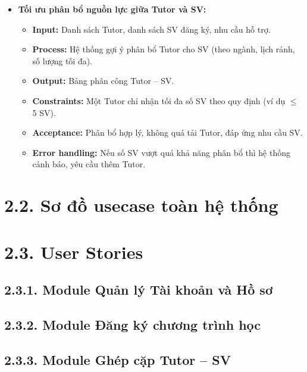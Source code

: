 \begin{itemize}
    \item \textbf{Tối ưu phân bổ nguồn lực giữa Tutor và SV:}
    \begin{itemize}
        \item \textbf{Input:} Danh sách Tutor, danh sách SV đăng ký, nhu cầu hỗ trợ.
        \item \textbf{Process:} Hệ thống gợi ý phân bổ Tutor cho SV (theo ngành, lịch rảnh, số lượng tối đa).
        \item \textbf{Output:} Bảng phân công Tutor – SV.
        \item \textbf{Constraints:} Một Tutor chỉ nhận tối đa số SV theo quy định (ví dụ $\leq$ 5 SV).
        \item \textbf{Acceptance:} Phân bổ hợp lý, không quá tải Tutor, đáp ứng nhu cầu SV.
        \item \textbf{Error handling:} Nếu số SV vượt quá khả năng phân bổ thì hệ thống cảnh báo, yêu cầu thêm Tutor.
    \end{itemize}
\end{itemize}



\section*{2.2. Sơ đồ usecase toàn hệ thống}


\section*{2.3. User Stories}
\subsection*{2.3.1. Module Quản lý Tài khoản và Hồ sơ}

\subsection*{2.3.2. Module Đăng ký chương trình học}

\subsection*{2.3.3. Module Ghép cặp Tutor – SV}


